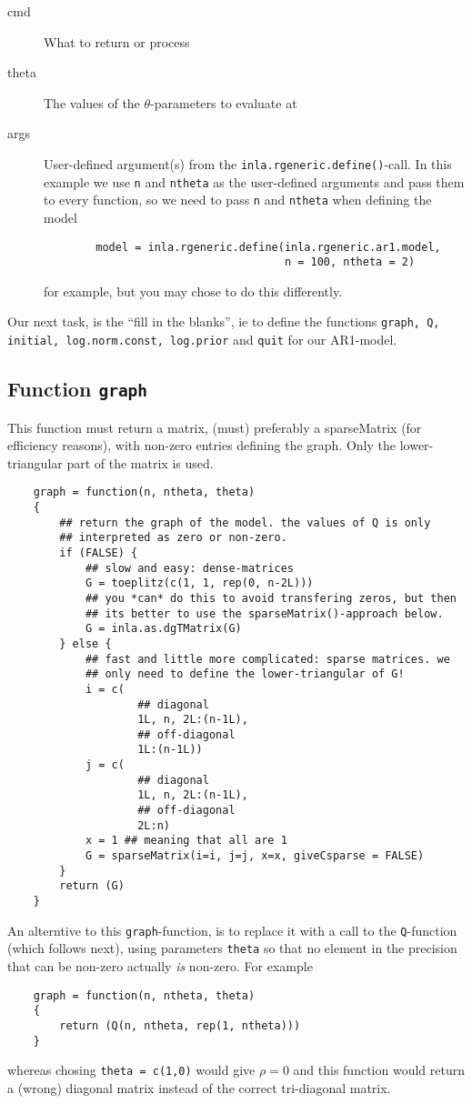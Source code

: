 \documentclass[a4paper,11pt]{article}
\begin{document}
\begin{description}
\item[cmd] What to return or process
\item[theta] The values of the $\theta$-parameters to evaluate at
\item[args] User-defined argument(s) from the
    \texttt{inla.rgeneric.define()}-call. In this example we use
    \texttt{n} and \texttt{ntheta} as the user-defined arguments and
    pass them to every function, so we need to pass \texttt{n} and
    \texttt{ntheta} when defining the model
\begin{verbatim}
        model = inla.rgeneric.define(inla.rgeneric.ar1.model,
                                     n = 100, ntheta = 2)
\end{verbatim}
    for example, but you may chose to do this differently.
\end{description}
Our next task, is the ``fill in the blanks'', ie to define the
functions \texttt{graph, Q, initial, log.norm.const, log.prior} and
\texttt{quit} for our AR1-model.

\subsection*{Function \texttt{graph}}

This function must return a matrix, (must) preferably a sparseMatrix
(for efficiency reasons), with non-zero entries defining the
graph. Only the lower-triangular part of the matrix is used.
\begin{verbatim}
    graph = function(n, ntheta, theta)
    {
        ## return the graph of the model. the values of Q is only
        ## interpreted as zero or non-zero.
        if (FALSE) {
            ## slow and easy: dense-matrices
            G = toeplitz(c(1, 1, rep(0, n-2L)))
            ## you *can* do this to avoid transfering zeros, but then
            ## its better to use the sparseMatrix()-approach below.
            G = inla.as.dgTMatrix(G)
        } else {
            ## fast and little more complicated: sparse matrices. we
            ## only need to define the lower-triangular of G!
            i = c(
                    ## diagonal
                    1L, n, 2L:(n-1L),
                    ## off-diagonal
                    1L:(n-1L))
            j = c(
                    ## diagonal
                    1L, n, 2L:(n-1L),
                    ## off-diagonal
                    2L:n)
            x = 1 ## meaning that all are 1
            G = sparseMatrix(i=i, j=j, x=x, giveCsparse = FALSE)
        }            
        return (G)
    }
\end{verbatim}
An alterntive to this \texttt{graph}-function, is to replace it with a
call to the \texttt{Q}-function (which follows next), using parameters
\texttt{theta} so that no element in the precision that can be
non-zero actually \emph{is} non-zero. For example
\begin{verbatim}
    graph = function(n, ntheta, theta)
    {
        return (Q(n, ntheta, rep(1, ntheta)))
    }
\end{verbatim}
whereas chosing \texttt{theta = c(1,0)} would give $\rho=0$ and this
function would return a (wrong) diagonal matrix instead of the correct
tri-diagonal matrix.
\end{document}
